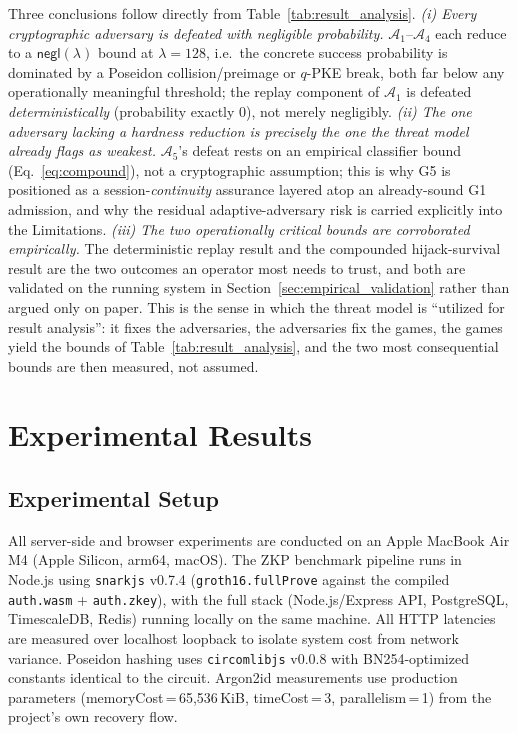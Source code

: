 \documentclass[journal,twoside,10pt]{IEEEtran}
\begin{document}
Three conclusions follow directly from Table~\ref{tab:result_analysis}.
\textit{(i) Every cryptographic adversary is defeated with negligible
probability.} $\mathcal{A}_1$--$\mathcal{A}_4$ each reduce to a
$\mathsf{negl}(\lambda)$ bound at $\lambda=128$, i.e.\ the concrete success
probability is dominated by a Poseidon collision/preimage or $q$-PKE break,
both far below any operationally meaningful threshold; the replay component
of $\mathcal{A}_1$ is defeated \emph{deterministically} (probability
exactly $0$), not merely negligibly. \textit{(ii) The one adversary lacking
a hardness reduction is precisely the one the threat model already flags as
weakest.} $\mathcal{A}_5$'s defeat rests on an empirical classifier bound
(Eq.~\ref{eq:compound}), not a cryptographic assumption; this is why G5 is
positioned as a session-\emph{continuity} assurance layered atop an
already-sound G1 admission, and why the residual adaptive-adversary risk is
carried explicitly into the Limitations. \textit{(iii) The two operationally
critical bounds are corroborated empirically.} The deterministic replay
result and the compounded hijack-survival result are the two outcomes an
operator most needs to trust, and both are validated on the running system
in Section~\ref{sec:empirical_validation} rather than argued only on paper.
This is the sense in which the threat model is ``utilized for result
analysis'': it fixes the adversaries, the adversaries fix the games, the
games yield the bounds of Table~\ref{tab:result_analysis}, and the two
most consequential bounds are then measured, not assumed.

\section{Experimental Results}
\label{sec:results}

\subsection{Experimental Setup}
All server-side and browser experiments are conducted on an Apple MacBook
Air M4 (Apple Silicon, arm64, macOS). The ZKP benchmark pipeline runs in
Node.js using \texttt{snarkjs} v0.7.4 (\texttt{groth16.fullProve} against
the compiled \texttt{auth.wasm} + \texttt{auth.zkey}), with the full stack
(Node.js/Express API, PostgreSQL, TimescaleDB, Redis) running locally on the
same machine. All HTTP latencies are measured over localhost loopback to
isolate system cost from network variance. Poseidon hashing uses
\texttt{circomlibjs} v0.0.8 with BN254-optimized constants identical to the
circuit. Argon2id measurements use production parameters
(memoryCost\,=\,65,536\,KiB, timeCost\,=\,3, parallelism\,=\,1) from the
project's own recovery flow.
\end{document}
